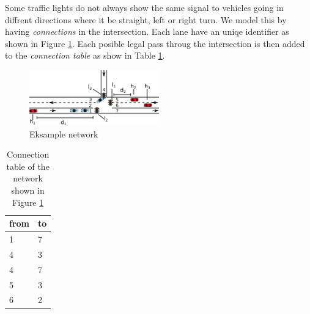 Some traffic lights do not always show the same signal to vehicles going in diffrent directions where it be straight, left or right turn. We model this by having \textit{connections} in the intersection. Each lane have an uniqe identifier as shown in Figure \ref{fig:Introduction:network}. Each posible legal pass throug the intersection is then added to the \textit{connection table} as show in Table \ref{tab:Introduction:connectionTable}.




\begin{figure}[htb]
\centering
\includegraphics[width=0.5\textwidth]{images/introNetwork.png}
\caption{Eksample network}
\label{fig:Introduction:network}
\end{figure}

\begin{table}[h]
\centering
\begin{tabular}{|l|l|}
\hline
from & to \\ \hline
1 & 7 \\ \hline
4 & 3 \\ \hline
4 & 7 \\ \hline
5 & 3 \\ \hline
6 & 2 \\ \hline
\end{tabular}
\caption{Connection table of the network shown in Figure \ref{fig:Introduction:network} }
\label{tab:Introduction:connectionTable}
\end{table}



